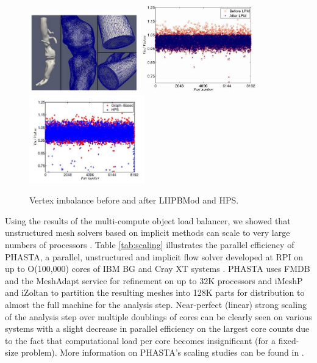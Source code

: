 \documentclass[letterpaper]{jpconf}
\begin{document}
\begin{figure}[htb] 
\begin{center}
\includegraphics[height=1.35in]{Figures/AAA.jpg}
\includegraphics[height=1.5in]{Figures/LIIPBMod8192.jpg}
\includegraphics[height=1.5in]{Figures/HPS8192.jpg}
\end{center}
\caption{Vertex imbalance before and after LIIPBMod and HPS.}
\label{fig:LIIP_HPScompare}
\end{figure}

Using the results of the multi-compute object load balancer, we
showed that unstructured mesh solvers based on implicit methods can
scale to very large numbers of processors \cite{Shep07}.  Table
\ref{tab:scaling} illustrates the parallel efficiency of PHASTA, a parallel,
unstructured and implicit flow solver developed at RPI on up to
O(100,000) cores of IBM BG and Cray XT systems \cite{phasta}.  PHASTA
uses FMDB and the MeshAdapt service for refinement on up to 32K
processors and iMeshP and iZoltan to partition the resulting meshes
into 128K parts for distribution to almost the full machine for the analysis
step.  Near-perfect (linear) strong scaling of the analysis step over
multiple doublings of cores can be clearly seen on various systems
with a slight decrease in parallel efficiency on the largest core
counts due to the fact that computational load per core becomes
insignificant (for a fixed-size problem).  More information on PHASTA's
scaling studies can be found in \cite{SaCa09}.
\end{document}
